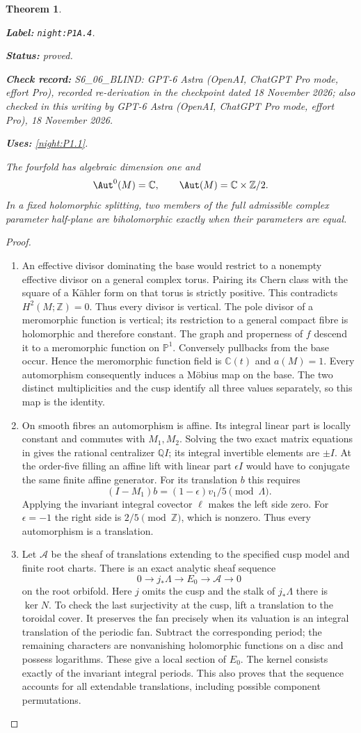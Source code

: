 \documentclass[11pt,a4paper]{article}
\newtheorem{theorem}{Theorem}[section]
\theoremstyle{definition}
\newcommand{\StatementRecord}[4]{\par\smallskip\begingroup\upshape\raggedright\noindent\textbf{Label:} \nolinkurl{#1}.\par\noindent\textbf{Status:} #2.\par\noindent\textbf{Check record:} #3.\par\noindent\textbf{Uses:} #4.\par\endgroup\smallskip}
\newcommand{\CurrentChecker}{GPT-6 Astra (OpenAI, ChatGPT Pro mode, effort Pro), 18 November 2026}
\begin{document}
\begin{theorem}\label{night:P1A.4}
\StatementRecord{night:P1A.4}{proved}{S6\_06\_BLIND: GPT-6 Astra (OpenAI, ChatGPT Pro mode, effort Pro), recorded re-derivation in the checkpoint dated 18 November 2026; also checked in this writing by \CurrentChecker}{\cref{night:P1.1}}
The fourfold has algebraic dimension one and
\[
\Aut^0(M)=\mathbb C,\qquad
\Aut(M)=\mathbb C\times\mathbb Z/2.
\]
In a fixed holomorphic splitting, two members of the full
admissible complex parameter half-plane are biholomorphic
exactly when their parameters are equal.
\end{theorem}
\begin{proof}
\begin{enumerate}[label=\arabic*.]
\item An effective divisor dominating the base would restrict to
a nonempty effective divisor on a general complex torus.
Pairing its Chern class with the square of a Kähler form
on that torus is strictly positive. This contradicts
$H^2(M;\mathbb Z)=0$. Thus every divisor is vertical.
The pole divisor of a meromorphic function is vertical;
its restriction to a general compact fibre is holomorphic
and therefore constant. The graph and properness of $f$
descend it to a meromorphic function on $\mathbb P^1$.
Conversely pullbacks from the base occur. Hence the
meromorphic function field is $\mathbb C(t)$ and $a(M)=1$.
Every automorphism consequently induces a Möbius map on
the base. The two distinct multiplicities and the cusp
identify all three values separately, so this map is the
identity.

\item On smooth fibres an automorphism is affine. Its integral
linear part is locally constant and commutes with $M_1,M_2$.
Solving the two exact matrix equations in
 gives the rational
centralizer $\mathbb Q I$; its integral invertible elements
are $\pm I$. At the order-five filling an affine lift with
linear part $\epsilon I$ would have to conjugate the same
finite affine generator. For its translation $b$ this
requires
\[
(I-M_1)b=(1-\epsilon)v_1/5\pmod\Lambda.
\]
Applying the invariant integral covector $\ell$ makes the
left side zero. For $\epsilon=-1$ the right side is
$2/5\pmod\mathbb Z$, which is nonzero. Thus every
automorphism is a translation.

\item Let $\mathcal A$ be the sheaf of translations extending to
the specified cusp model and finite root charts. There is
an exact analytic sheaf sequence
\[
0\to j_*\Lambda\to E_0\to\mathcal A\to0
\]
on the root orbifold. Here $j$ omits the cusp and the stalk
of $j_*\Lambda$ there is $\ker N$.
To check the last surjectivity at the cusp, lift a translation
to the toroidal cover. It preserves the fan precisely when
its valuation is an integral translation of the periodic
fan. Subtract the corresponding period; the remaining
characters are nonvanishing holomorphic functions on a
disc and possess logarithms. These give a local section
of $E_0$. The kernel consists exactly of the invariant
integral periods. This also proves that the sequence
accounts for all extendable translations, including
possible component permutations.


\end{enumerate}
\end{proof}
\end{document}
